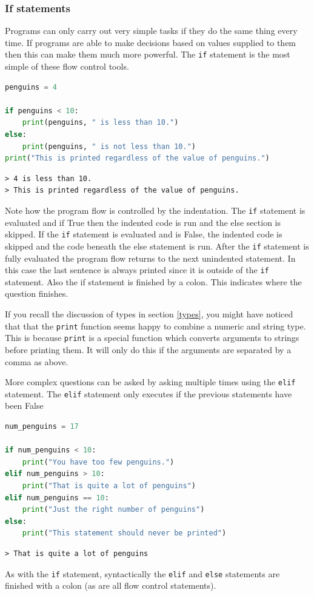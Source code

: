 		\subsubsection{If statements}
		Programs can only carry out very simple tasks if they do the same thing every time. If programs are able to make decisions based on values supplied to them then this can make them much more powerful. The \texttt{if} statement is the most simple of these flow control tools.
		
		\begin{lstlisting}[language=Python]
penguins = 4

if penguins < 10:
	print(penguins, " is less than 10.")
else:
	print(penguins, " is not less than 10.")
print("This is printed regardless of the value of penguins.")\end{lstlisting}
		\begin{verbatim}
> 4 is less than 10.
> This is printed regardless of the value of penguins.\end{verbatim}	
		Note how the program flow is controlled by the indentation. The \texttt{if} statement  is evaluated and if True then the indented code is run and the else section is skipped. If the \texttt{if} statement  is evaluated and is False, the indented code is skipped and the code beneath the else statement is run. After the \texttt{if}  statement is fully evaluated the program flow returns to the next unindented statement. In this case the last sentence is always printed since it is outside of the \texttt{if} statement. Also the if statement is finished by a colon. This indicates where the question finishes.
		
		If you recall the discussion of types in section \ref{types}, you might have noticed that that the \texttt{print} function seems happy to combine a numeric and string type. This is because \texttt{print} is a special function which converts arguments to strings before printing them. It will only do this if the arguments are separated by a comma as above.
		
		More complex questions can be asked by asking multiple times using the \texttt{elif} statement. The \texttt{elif} statement only executes if the previous statements have been False
		\begin{lstlisting}[language=Python]
num_penguins = 17

if num_penguins < 10:
	print("You have too few penguins.")
elif num_penguins > 10:
	print("That is quite a lot of penguins")
elif num_penguins == 10:
	print("Just the right number of penguins")
else:
	print("This statement should never be printed")\end{lstlisting}
		\begin{verbatim}> That is quite a lot of penguins\end{verbatim}
As with the \texttt{if} statement, syntactically the \texttt{elif} and \texttt{else} statements are finished with a colon (as are all flow control statements).	

